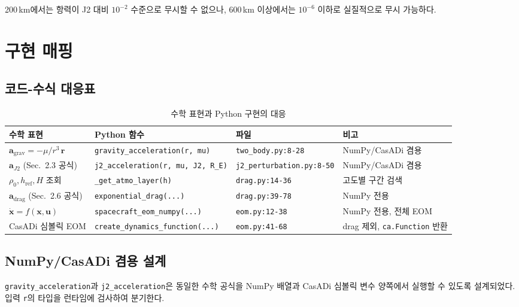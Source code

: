 \documentclass[11pt]{article}
\begin{document}
200\,km에서는 항력이 J2 대비 $10^{-2}$ 수준으로 무시할 수 없으나, 600\,km 이상에서는 $10^{-6}$ 이하로 실질적으로 무시 가능하다.


\section{구현 매핑}

\subsection{코드-수식 대응표}

\begin{table}[h]
\centering
\caption{수학 표현과 Python 구현의 대응}
\label{tab:code_mapping}
\begin{tabular}{llll}
\toprule
수학 표현 & Python 함수 & 파일 & 비고 \\
\midrule
$\mathbf{a}_{\text{grav}} = -\mu/r^3\,\mathbf{r}$ & \texttt{gravity\_acceleration(r, mu)} & \texttt{two\_body.py:8-28} & NumPy/CasADi 겸용 \\
$\mathbf{a}_{J2}$ (Sec.~2.3 공식) & \texttt{j2\_acceleration(r, mu, J2, R\_E)} & \texttt{j2\_perturbation.py:8-50} & NumPy/CasADi 겸용 \\
$\rho_0, h_{\text{ref}}, H$ 조회 & \texttt{\_get\_atmo\_layer(h)} & \texttt{drag.py:14-36} & 고도별 구간 검색 \\
$\mathbf{a}_{\text{drag}}$ (Sec.~2.6 공식) & \texttt{exponential\_drag(...)} & \texttt{drag.py:39-78} & NumPy 전용 \\
$\dot{\mathbf{x}} = f(\mathbf{x}, \mathbf{u})$ & \texttt{spacecraft\_eom\_numpy(...)} & \texttt{eom.py:12-38} & NumPy 전용, 전체 EOM \\
CasADi 심볼릭 EOM & \texttt{create\_dynamics\_function(...)} & \texttt{eom.py:41-68} & drag 제외, \texttt{ca.Function} 반환 \\
\bottomrule
\end{tabular}
\end{table}


\subsection{NumPy/CasADi 겸용 설계}

\texttt{gravity\_acceleration}과 \texttt{j2\_acceleration}은 동일한 수학 공식을 NumPy 배열과 CasADi 심볼릭 변수 양쪽에서 실행할 수 있도록 설계되었다. 입력 \texttt{r}의 타입을 런타임에 검사하여 분기한다.
\end{document}
